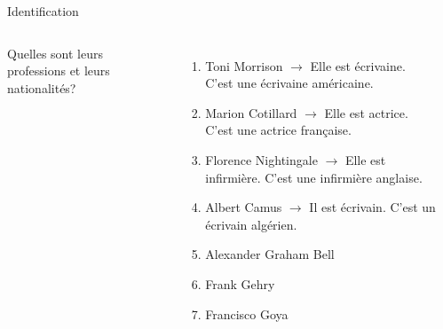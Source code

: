 \begin{frame}{Identification}
  \begin{columns}
      {\scriptsize
      Quelles sont leurs professions et leurs nationalités?
      \begin{enumerate}
        \item Toni Morrison
         {$\to$ Elle est écrivaine. C'est une écrivaine américaine.}
        \item<3-> Marion Cotillard
         {$\to$ Elle est actrice. C'est une actrice française.}
        \item<5-> Florence Nightingale
         {$\to$ Elle est infirmière. C'est une infirmière anglaise.}
        \item<7-> Albert Camus
         {$\to$ Il est écrivain. C'est un écrivain algérien.}
        \item<9-> Alexander Graham Bell
        \item<11-> Frank Gehry
        \item<13-> Francisco Goya
      \end{enumerate}
      }
      \begin{minipage}[c][0.6\textheight]{\linewidth}
        \begin{center}
        \end{center}
      \end{minipage}
  \end{columns}
\end{frame}